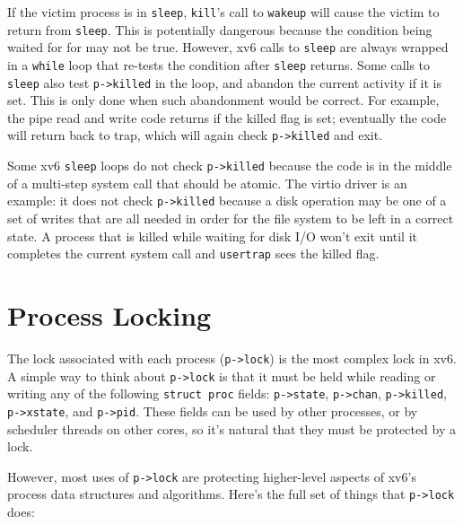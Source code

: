 If the victim process is in
\lstinline{sleep},
\lstinline{kill}'s call to
\lstinline{wakeup}
will cause the victim to return from
\lstinline{sleep}.
This is potentially dangerous because 
the condition being waited for for may not be true.
However, xv6 calls to
\lstinline{sleep}
are always wrapped in a
\lstinline{while}
loop that re-tests the condition after
\lstinline{sleep}
returns.
Some calls to
\lstinline{sleep}
also test
\lstinline{p->killed}
in the loop, and abandon the current activity if it is set.
This is only done when such abandonment would be correct.
For example, the pipe read and write code
returns if the killed flag is set; eventually the
code will return back to trap, which will again
check \lstinline{p->killed} and exit.

Some xv6 
\lstinline{sleep}
loops do not check
\lstinline{p->killed} 
because the code is in the middle of a multi-step
system call that should be atomic.
The virtio driver
is an example: it does not check
\lstinline{p->killed}
because a disk operation may be one of a set of
writes that are all needed in order for the file system to
be left in a correct state.
A process that is killed while waiting for disk I/O won't
exit until it completes the current system call and
\lstinline{usertrap} sees the killed flag.

\section{Process Locking}

The lock associated with each process (\lstinline{p->lock}) is the
most complex lock in xv6.
A simple way to think about \lstinline{p->lock} is
that it must be held while reading or writing any of the following
\lstinline{struct proc} fields:
\lstinline{p->state},
\lstinline{p->chan},
\lstinline{p->killed},
\lstinline{p->xstate},
and
\lstinline{p->pid}.
These fields can be used by other processes, or by scheduler
threads on other cores, so it's natural that they
must be protected by a lock.

However, most uses of \lstinline{p->lock} are protecting higher-level
aspects of xv6's process data structures and algorithms. Here's
the full set of things that \lstinline{p->lock} does:


